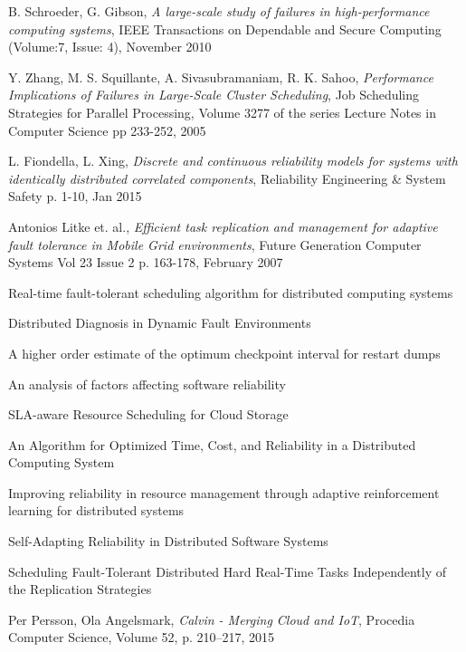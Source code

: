 \documentclass{cslthse-msc}
\begin{document}
\begin{thebibliography}{50}
	B. Schroeder, G. Gibson,
	\emph{A large-scale study of failures in high-performance computing systems},
	IEEE Transactions on Dependable and Secure Computing (Volume:7,  Issue: 4),
	November 2010

	Y. Zhang, M. S. Squillante, A. Sivasubramaniam, R. K. Sahoo,
	\emph{Performance Implications of Failures in Large-Scale Cluster Scheduling},
	Job Scheduling Strategies for Parallel Processing, Volume 3277 of the series Lecture Notes in Computer Science pp 233-252,
	2005

	L. Fiondella, L. Xing,
	\emph{Discrete and continuous reliability models for systems with identically distributed correlated components},
	Reliability Engineering \& System Safety p. 1-10,
	Jan 2015

	Antonios Litke et. al.,	
	\emph{Efficient task replication and management for adaptive fault tolerance in Mobile Grid environments},
	Future Generation Computer Systems Vol 23 Issue 2 p. 163-178,
	February 2007

Real-time fault-tolerant scheduling algorithm for distributed computing systems

Distributed Diagnosis in Dynamic Fault Environments

A higher order estimate of the optimum checkpoint interval for restart dumps

An analysis of factors affecting software reliability

SLA-aware Resource Scheduling for Cloud Storage

An Algorithm for Optimized Time, Cost, and Reliability in a Distributed Computing System

Improving reliability in resource management through adaptive reinforcement learning for distributed systems

Self-Adapting Reliability in Distributed Software Systems

Scheduling Fault-Tolerant Distributed Hard Real-Time Tasks Independently of the Replication Strategies

	Per Persson, Ola Angelsmark,
	\emph{Calvin - Merging Cloud and IoT},
	Procedia Computer Science, Volume 52, p. 210–217,
	2015


\end{thebibliography}
\end{document}
